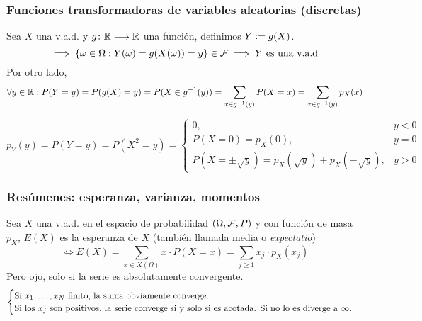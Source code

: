 \subsubsection{Funciones transformadoras de variables aleatorias (discretas)}
Sea $X$ una v.a.d. y $g \colon \mathbb{R} \longrightarrow \mathbb{R}$ una función, definimos $Y\vcentcolon= g(X)$.
\[\implies \{\omega \in\Omega:Y(\omega)=g(X(\omega))=y\} \in \mathcal{F} \implies Y\text{ es una v.a.d}\]
Por otro lado,
\[\forall y \in \mathbb{R}:P(Y=y)=P(g(X)=y)=P(X\in g^{-1}(y))=\sum_{x\in g^{-1}(y)}P(X=x)=\sum_{x\in g^{-1}(y)}p_X(x)\]

\begin{ejem}[$Y=x^2$]
	$$p_Y(y) = P(Y=y)=P(X^2=y)=\begin{cases}
			0,                                                                              & y <0 \\
			P(X=0)=p_X(0),                                                                  & y=0  \\
			P\left(X=\pm\sqrt{y}\right)=p_X\left(\sqrt{y}\right)+p_X\left(-\sqrt{y}\right), & y>0
		\end{cases}$$
\end{ejem}

\subsubsection{Resúmenes: esperanza, varianza, momentos}

\begin{defn}[Esperanza]
	Sea $X$ una v.a.d. en el espacio de probabilidad $(\Omega, \mathcal{F}, P)$ y con función de masa $p_X$, $E(X)$ es la esperanza de $X$ (también llamada media o \emph{expectatio})
	\[\iff E(X)=\sum_{x\in X(\Omega)}x\cdot P(X=x)=\sum_{j\geq 1}x_j\cdot p_X(x_j)\]
	Pero ojo, solo si la serie es absolutamente convergente.
	\[\begin{cases} \text{Si $x_1, \dots, x_N$ finito, la suma obviamente converge.} \\
			\text{Si los $x_j$ son positivos, la serie converge si y solo si es acotada. Si no lo es diverge a $\infty$.}\end{cases}\]
\end{defn}

